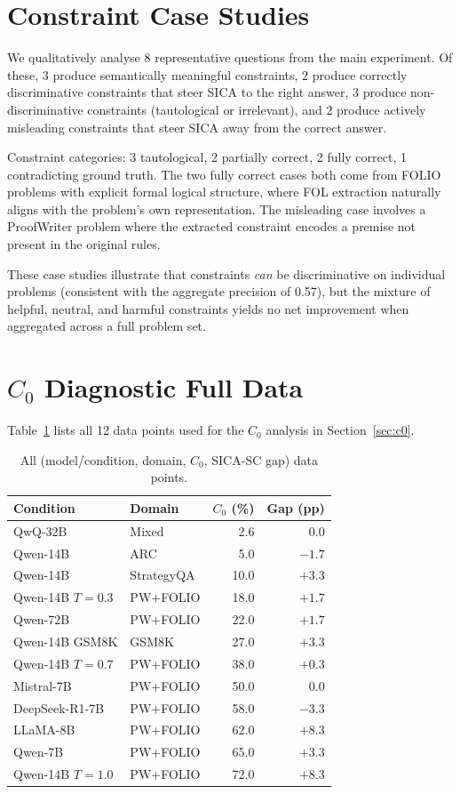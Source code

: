 \documentclass[11pt]{article}
\begin{document}
\section{Constraint Case Studies}
\label{app:case_studies}

We qualitatively analyse 8 representative questions from the main experiment.
Of these, 3 produce semantically meaningful constraints, 2 produce correctly discriminative constraints that steer SICA to the right answer, 3 produce non-discriminative constraints (tautological or irrelevant), and 2 produce actively misleading constraints that steer SICA away from the correct answer.

Constraint categories: 3 tautological, 2 partially correct, 2 fully correct, 1 contradicting ground truth.
The two fully correct cases both come from FOLIO problems with explicit formal logical structure, where FOL extraction naturally aligns with the problem's own representation.
The misleading case involves a ProofWriter problem where the extracted constraint encodes a premise not present in the original rules.

These case studies illustrate that constraints \emph{can} be discriminative on individual problems (consistent with the aggregate precision of 0.57), but the mixture of helpful, neutral, and harmful constraints yields no net improvement when aggregated across a full problem set.

\section{$C_0$ Diagnostic Full Data}
\label{app:c0_data}

Table~\ref{tab:c0_full} lists all 12 data points used for the $C_0$ analysis in Section~\ref{sec:c0}.

\begin{table}[h]
\centering
\caption{All (model/condition, domain, $C_0$, SICA-SC gap) data points.}
\label{tab:c0_full}
\small
\begin{tabular}{@{}llrr@{}}
\toprule
Condition & Domain & $C_0$ (\%) & Gap (pp) \\
\midrule
QwQ-32B & Mixed & 2.6 & $0.0$ \\
Qwen-14B & ARC & 5.0 & $-1.7$ \\
Qwen-14B & StrategyQA & 10.0 & $+3.3$ \\
Qwen-14B $T{=}0.3$ & PW+FOLIO & 18.0 & $+1.7$ \\
Qwen-72B & PW+FOLIO & 22.0 & $+1.7$ \\
Qwen-14B GSM8K & GSM8K & 27.0 & $+3.3$ \\
Qwen-14B $T{=}0.7$ & PW+FOLIO & 38.0 & $+0.3$ \\
Mistral-7B & PW+FOLIO & 50.0 & $0.0$ \\
DeepSeek-R1-7B & PW+FOLIO & 58.0 & $-3.3$ \\
LLaMA-8B & PW+FOLIO & 62.0 & $+8.3$ \\
Qwen-7B & PW+FOLIO & 65.0 & $+3.3$ \\
Qwen-14B $T{=}1.0$ & PW+FOLIO & 72.0 & $+8.3$ \\
\bottomrule
\end{tabular}
\end{table}
\end{document}
